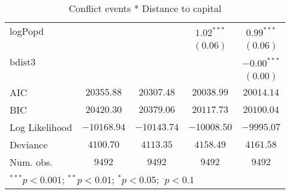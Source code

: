 \begin{sidewaystable}
\begin{center}
{\begin{tabular}{l c c c c}
logPopd              &               &               & $1.02^{***}$  & $0.99^{***}$  \\
                     &               &               & $(0.06)$      & $(0.06)$      \\
bdist3               &               &               &               & $-0.00^{***}$ \\
                     &               &               &               & $(0.00)$      \\
\hline
AIC                  & $20355.88$    & $20307.48$    & $20038.99$    & $20014.14$    \\
BIC                  & $20420.30$    & $20379.06$    & $20117.73$    & $20100.04$    \\
Log Likelihood       & $-10168.94$   & $-10143.74$   & $-10008.50$   & $-9995.07$    \\
Deviance             & $4100.70$     & $4113.35$     & $4158.49$     & $4161.58$     \\
Num. obs.            & $9492$        & $9492$        & $9492$        & $9492$        \\
\hline
\multicolumn{5}{l}{\scriptsize{$^{***}p<0.001$; $^{**}p<0.01$; $^{*}p<0.05$; $^{\cdot}p<0.1$}}
\end{tabular}
}
\caption{Conflict events *
		  Distance to capital}
\label{interaction_state_based}
\end{center}
\end{sidewaystable}
